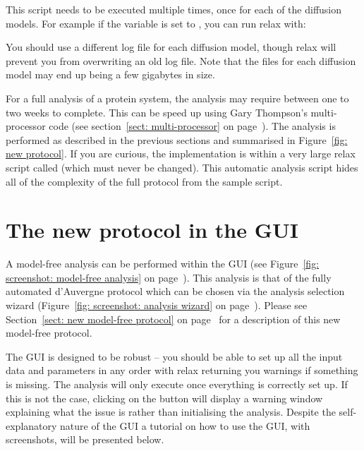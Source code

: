 \begin{htmlonly}
\begin{htmlonly}
This script needs to be executed multiple times, once for each of the diffusion models.  For example if the  variable is set to , you can run relax with:


You should use a different log file for each diffusion model, though relax will prevent you from overwriting an old log file.  Note that the  files for each diffusion model may end up being a few gigabytes in size.

For a full analysis of a protein system, the analysis may require between one to two weeks to complete.  This can be speed up using Gary Thompson's multi-processor code (see section~\ref{sect: multi-processor} on page~\pageref{sect: multi-processor}).  The analysis is performed as described in the previous sections and summarised in Figure~\ref{fig: new protocol}.  If you are curious, the implementation is within a very large relax script called  (which must never be changed).  This automatic analysis script hides all of the complexity of the full protocol from the sample script.




\newpage
\section{The new protocol in the GUI}

A model-free analysis can be performed within the GUI (see Figure~\ref{fig: screenshot: model-free analysis} on page~\pageref{fig: screenshot: model-free analysis}).  This analysis is that of the fully automated d'Auvergne protocol which can be chosen via the analysis selection wizard (Figure~\ref{fig: screenshot: analysis wizard} on page~\pageref{fig: screenshot: analysis wizard}).  Please see Section~\ref{sect: new model-free protocol} on page~\pageref{sect: new model-free protocol} for a description of this new model-free protocol.

The GUI is designed to be robust -- you should be able to set up all the input data and parameters in any order with relax returning you warnings if something is missing.  The analysis will only execute once everything is correctly set up.  If this is not the case, clicking on the  button will display a warning window explaining what the issue is rather than initialising the analysis.  Despite the self-explanatory nature of the GUI a tutorial on how to use the GUI, with screenshots, will be presented below.


\end{htmlonly}
\end{htmlonly}

